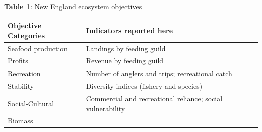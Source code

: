 \documentclass[11pt,]{article}
\begin{document}
\textbf{Table 1}: New England ecosystem objectives

\begin{longtable}[]{@{}ll@{}}
\toprule
\begin{minipage}[b]{0.29\columnwidth}\raggedright\strut
Objective Categories\strut
\end{minipage} & \begin{minipage}[b]{0.65\columnwidth}\raggedright\strut
Indicators reported here\strut
\end{minipage}\tabularnewline
\midrule
\endhead
\begin{minipage}[t]{0.29\columnwidth}\raggedright\strut
Seafood production\strut
\end{minipage} & \begin{minipage}[t]{0.65\columnwidth}\raggedright\strut
Landings by feeding guild\strut
\end{minipage}\tabularnewline
\begin{minipage}[t]{0.29\columnwidth}\raggedright\strut
Profits\strut
\end{minipage} & \begin{minipage}[t]{0.65\columnwidth}\raggedright\strut
Revenue by feeding guild\strut
\end{minipage}\tabularnewline
\begin{minipage}[t]{0.29\columnwidth}\raggedright\strut
Recreation\strut
\end{minipage} & \begin{minipage}[t]{0.65\columnwidth}\raggedright\strut
Number of anglers and trips; recreational catch\strut
\end{minipage}\tabularnewline
\begin{minipage}[t]{0.29\columnwidth}\raggedright\strut
Stability\strut
\end{minipage} & \begin{minipage}[t]{0.65\columnwidth}\raggedright\strut
Diversity indices (fishery and species)\strut
\end{minipage}\tabularnewline
\begin{minipage}[t]{0.29\columnwidth}\raggedright\strut
Social-Cultural\strut
\end{minipage} & \begin{minipage}[t]{0.65\columnwidth}\raggedright\strut
Commercial and recreational reliance; social vulnerability\strut
\end{minipage}\tabularnewline
\begin{minipage}[t]{0.29\columnwidth}\raggedright\strut
Biomass\strut
\end{minipage} & \begin{minipage}[t]{0.65\columnwidth}\raggedright\strut

\end{minipage}
\end{longtable}
\end{document}
